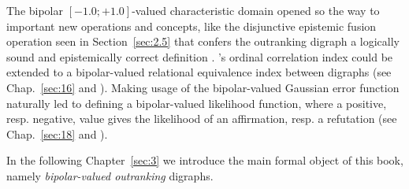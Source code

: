 The bipolar $[-1.0;+1.0]$-valued characteristic domain opened so the way to important new operations and concepts, like the disjunctive epistemic fusion operation seen in Section~\vref{sec:2.5} that confers the outranking digraph a logically sound and epistemically correct definition \citep{BIS-2013}. \Kendall 's ordinal correlation index could be extended to a bipolar-valued relational equivalence index between digraphs (see Chap.~\ref{sec:16} and \citealp{BIS-2012a}). Making usage of the bipolar-valued Gaussian error function naturally led to defining a bipolar-valued likelihood function, where a positive, resp. negative, value gives the likelihood of an affirmation, resp. a refutation (see Chap.~\ref{sec:18} and \citealp{BIS-2014}).      

\vspace{\baselineskip}
In the following Chapter~\ref{sec:3}  we introduce the main formal object of this book, namely \emph{bipolar-valued outranking} digraphs.

{}
{}

%
%
